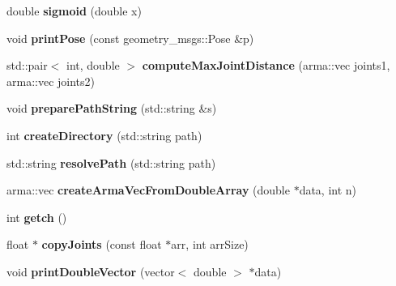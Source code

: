 \begin{DoxyCompactItemize}
\item 
double {\bfseries sigmoid} (double x)\hypertarget{namespacekukadu_adcb0adeb882b6c960bdaaeb78de3f195}{}\label{namespacekukadu_adcb0adeb882b6c960bdaaeb78de3f195}

\item 
void {\bfseries print\+Pose} (const geometry\+\_\+msgs\+::\+Pose \&p)\hypertarget{namespacekukadu_a3fb37a9c958c64d8f6b0159db10fd9a7}{}\label{namespacekukadu_a3fb37a9c958c64d8f6b0159db10fd9a7}

\item 
std\+::pair$<$ int, double $>$ {\bfseries compute\+Max\+Joint\+Distance} (arma\+::vec joints1, arma\+::vec joints2)\hypertarget{namespacekukadu_aeaef26c52b75df572f6481a2cd77f010}{}\label{namespacekukadu_aeaef26c52b75df572f6481a2cd77f010}

\item 
void {\bfseries prepare\+Path\+String} (std\+::string \&s)\hypertarget{namespacekukadu_a1a615b8c4aa3b3478ac8275cbcd15275}{}\label{namespacekukadu_a1a615b8c4aa3b3478ac8275cbcd15275}

\item 
int {\bfseries create\+Directory} (std\+::string path)\hypertarget{namespacekukadu_a90844d1af728408298335074234cb6bf}{}\label{namespacekukadu_a90844d1af728408298335074234cb6bf}

\item 
std\+::string {\bfseries resolve\+Path} (std\+::string path)\hypertarget{namespacekukadu_a7b1f2056450bc85b74ecc4538afeb205}{}\label{namespacekukadu_a7b1f2056450bc85b74ecc4538afeb205}

\item 
arma\+::vec {\bfseries create\+Arma\+Vec\+From\+Double\+Array} (double $\ast$data, int n)\hypertarget{namespacekukadu_acfe94f7c9dedf7e326afcede6c0dc470}{}\label{namespacekukadu_acfe94f7c9dedf7e326afcede6c0dc470}

\item 
int {\bfseries getch} ()\hypertarget{namespacekukadu_a9e31ceb82001724baca14add7b29be90}{}\label{namespacekukadu_a9e31ceb82001724baca14add7b29be90}

\item 
float $\ast$ {\bfseries copy\+Joints} (const float $\ast$arr, int arr\+Size)\hypertarget{namespacekukadu_ab997169b5dbe7f4f32cf8b65cb5eff23}{}\label{namespacekukadu_ab997169b5dbe7f4f32cf8b65cb5eff23}

\item 
void {\bfseries print\+Double\+Vector} (vector$<$ double $>$ $\ast$data)\hypertarget{namespacekukadu_aba879f8f78972a2d5f1dce992888564c}{}\label{namespacekukadu_aba879f8f78972a2d5f1dce992888564c}


\end{DoxyCompactItemize}
